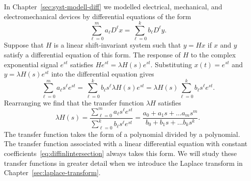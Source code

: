 In Chapter~\ref{sec:syst-modell-diff} we modelled electrical, mechanical, and electromechanical devices by differential equations of the form
\begin{equation}\label{eq:diffinlintersection}
\sum_{\ell=0}^{m} a_\ell D^\ell x = \sum_{\ell=0}^{k} b_\ell D^\ell y.
\end{equation}
Suppose that $H$ is a linear shift-invariant system such that $y = Hx$ if $x$ and $y$ satisfy a differential equation of this form.  The response of $H$ to the complex exponential signal $e^{st}$ satisfies $He^{st} = \lambda H(s) e^{st}$.  Substituting $x(t) = e^{st}$ and $y = \lambda H(s) e^{st}$ into the differential equation gives
\[
\sum_{\ell=0}^{m} a_\ell s^{\ell} e^{st} = \sum_{\ell=0}^{k} b_\ell s^{\ell} \lambda H(s) e^{st} = \lambda H(s) \sum_{\ell=0}^{k} b_\ell s^{\ell} e^{st}.
\]
Rearranging we find that the transfer function $\lambda H$ satisfies
\begin{equation} \label{eq:findtransferfuncfromdiff}
\lambda H(s) = \frac{\sum_{\ell=0}^{m} a_\ell s^{\ell} e^{st}}{\sum_{\ell=0}^{k} b_\ell s^{\ell} e^{st}} = \frac{a_0 + a_1s + \dots a_m s^m}{b_0 + b_1s + \dots b_k s^k}.
\end{equation}
The transfer function takes the form of a polynomial divided by a polynomial.  The transfer function associated with a linear differential equation with constant coefficients~\eqref{eq:diffinlintersection} always takes this form.  We will study these transfer functions in greater detail when we introduce the Laplace transform in Chapter~\ref{sec:laplace-transform}.


